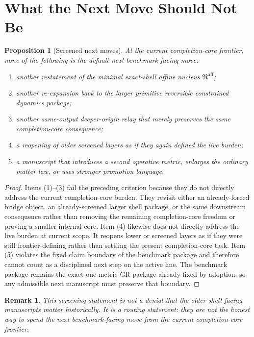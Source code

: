 \documentclass[11pt]{article}
\newcommand{\AffineNucleus}{\mathfrak N^{\mathrm{aff}}}
\newtheorem{proposition}{Proposition}
\newtheorem{remark}{Remark}
\begin{document}
\section{What the Next Move Should Not Be}

\begin{proposition}[Screened next moves]
At the current completion-core frontier, none of the following is the default next benchmark-facing move:
\begin{enumerate}
    \item another restatement of the minimal exact-shell affine nucleus \(\AffineNucleus\);
    \item another re-expansion back to the larger primitive reversible constrained dynamics package;
    \item another same-output deeper-origin relay that merely preserves the same completion-core consequence;
    \item a reopening of older screened layers as if they again defined the live burden;
    \item a manuscript that introduces a second operative metric, enlarges the ordinary matter law, or uses stronger promotion language.
\end{enumerate}
\end{proposition}

\begin{proof}
Items (1)--(3) fail the preceding criterion because they do not directly address the current completion-core burden. They revisit either an already-forced bridge object, an already-screened larger shell package, or the same downstream consequence rather than removing the remaining completion-core freedom or proving a smaller internal core. Item (4) likewise does not directly address the live burden at current scope. It reopens lower or screened layers as if they were still frontier-defining rather than settling the present completion-core task. Item (5) violates the fixed claim boundary of the benchmark package and therefore cannot count as a disciplined next step on the active line. The benchmark package remains the exact one-metric GR package already fixed by adoption, so any admissible next manuscript must preserve that boundary.
\end{proof}

\begin{remark}
This screening statement is not a denial that the older shell-facing manuscripts matter historically. It is a routing statement: they are not the honest way to spend the next benchmark-facing move from the current completion-core frontier.
\end{remark}
\end{document}
